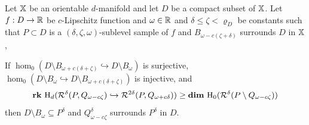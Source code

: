 
\begin{theorem}\label{thm:algo_tcc}
  Let $\mathbb{X}$ be an orientable $d$-manifold and let $D$ be a compact subset of $\mathbb{X}$.
  Let $f : D\to\mathbb{R}$ be $c$-Lipschitz function and $\omega\in\mathbb{R}$ and $\delta\leq\zeta < \varrho_D$ be constants such that $P\subset D$ is a $(\delta,\zeta,\omega)$-sublevel sample of $f$ and $B_{\omega - c(\zeta +\delta)}$ surrounds $D$ in $\mathbb{X}$,


  If $\hom_0(D\setminus B_{\omega+c(\delta+\zeta)}\hookrightarrow D\setminus B_\omega)$ is surjective, $\hom_0(D\setminus B_\omega\hookrightarrow D\setminus B_{\omega+c(\delta+\zeta)})$ is injective, and
  \[\mathbf{rk}~\mathrm{H}_d(\mathcal{R}^\delta(P, Q_{\omega -c\zeta})\hookrightarrow \mathcal{R}^{2\delta}(P, Q_{\omega+c\delta})) \geq \mathbf{dim}~\mathrm{H}_0(\mathcal{R}^\delta(P\setminus Q_{\omega-c\zeta}))\]
  then $D\setminus B_\omega\subseteq P^\delta$ and $Q_{\omega-c\zeta}^\delta$ surrounds $P^\delta$ in $D$.
\end{theorem}
